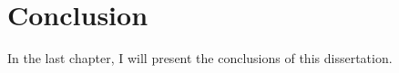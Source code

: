 \chapter{Conclusion}%
\label{chapter:conclusion}

\begin{introduction}
In the last chapter, I will present the conclusions of this dissertation.
\end{introduction} 


